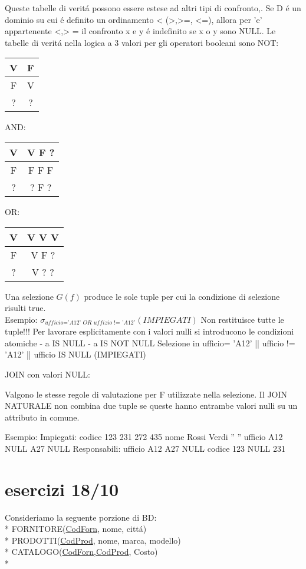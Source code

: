 \documentclass[10pt]{report}
\begin{document}
Queste tabelle di verit\'a possono essere estese ad altri tipi di confronto,. Se D \'e un dominio su cui \'e definito un ordinamento < (>,>=, <=), allora per 'e' appartenente {<,> =} il confronto x e y \'e indefinito se x o y sono NULL.
Le tabelle di verit\'a   nella logica a 3 valori per gli operatori booleani sono 
NOT:
\begin{tabular}{|c|c|}
\hline 
V & F \\ 
\hline 
F & V \\ 
\hline 
? & ? \\ 
\hline 
\end{tabular} 
AND:
\begin{tabular}{|c|c|}
\hline 
V & V F ? \\ 
\hline 
F & F F F \\ 
\hline 
? & ? F ? \\ 
\hline 
\end{tabular} 
OR:
\begin{tabular}{|c|c|}
\hline 
V & V V V \\ 
\hline 
F & V F ? \\ 
\hline 
? & V ? ? \\*
\hline 
\end{tabular} 

Una selezione $G(f)$ produce le sole tuple per cui la condizione di selezione risulti true.\\
Esempio:
	$\sigma _{ \textit{ufficio='A12' OR uffizio != 'A12'}} (\textit{IMPIEGATI})$
Non restituisce tutte le tuple!!!
Per lavorare esplicitamente con i valori nulli si introducono le condizioni  atomiche
	- a IS NULL
	- a IS NOT NULL
Selezione in ufficio= 'A12' || ufficio != 'A12' || ufficio IS NULL (IMPIEGATI)

JOIN con valori NULL:

Valgono le stesse regole di valutazione per F utilizzate nella selezione. Il JOIN NATURALE non combina due tuple se queste hanno entrambe valori nulli su un attributo in comune.

Esempio:
	Impiegati:
		codice 123 	231 	272 	435
		nome 	Rossi	Verdi	''	''
		ufficio	A12 	NULL 	A27 	NULL
	Responsabili:
		ufficio A12 	A27 	NULL
		codice	123	NULL	231
		
		
\section{esercizi 18/10}
Consideriamo la seguente porzione di BD:\\*
\newline
FORNITORE(\underline{CodForn}, nome, citt\'a)\\*
PRODOTTI(\underline{CodProd}, nome, marca, modello)\\*
CATALOGO(\underline{CodForn},\underline{CodProd}, Costo)\\*
\end{document}

